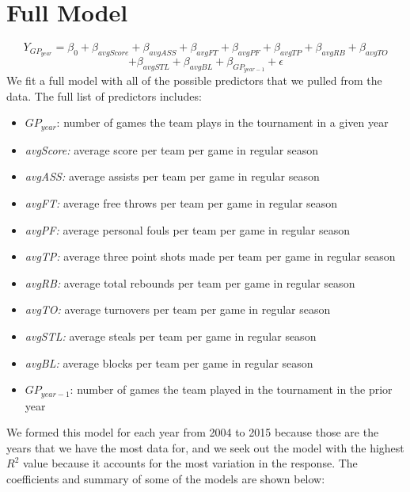 \documentclass[]{scrartcl}
\begin{document}
\section*{Full Model}
	\[
Y_{GP_{year}} = \beta_0 + \beta_{avgScore} + \beta_{avgASS} +\beta_{avgFT} + \beta_{avgPF} + \beta_{avgTP} + \beta_{avgRB} + \beta_{avgTO}
\] 
\[
+ \beta_{avgSTL} +\beta_{avgBL} + \beta_{GP_{year-1}}+ \epsilon
\]
We fit a full model with all of the possible predictors that we pulled from the data. The full list of predictors includes:
	\begin{itemize}
	\item 	{$GP_{year}$:} number of games the team plays in the tournament in a given year
	\item 	{\textit{avgScore:}} average score per team per game in regular season
	\item 	{\textit{avgASS:}} average assists per team per game in regular season
	\item 	{\textit{avgFT:}} average free throws per team per game in regular season
	\item 	{\textit{avgPF:}} average personal fouls per team per game in regular season
	\item 	{\textit{avgTP:}} average three point shots made per team per game in regular season
	\item 	{\textit{avgRB:}} average total rebounds per team per game in regular season
	\item 	{\textit{avgTO:}} average turnovers per team per game in regular season
	\item 	{\textit{avgSTL:}} average steals per team per game in regular season
	\item 	{\textit{avgBL:}} average blocks per team per game in regular season
	\item 	{$GP_{year-1}$:} number of games the team played in the tournament in the prior year
	\end{itemize}
We formed this model for each year from 2004 to 2015 because those are the years that we have the most data for, and we seek out the model with the highest $R^{2}$ value because it accounts for the most variation in the response. The coefficients and summary of some of the models are shown below:
\footnotesize
\end{document}

